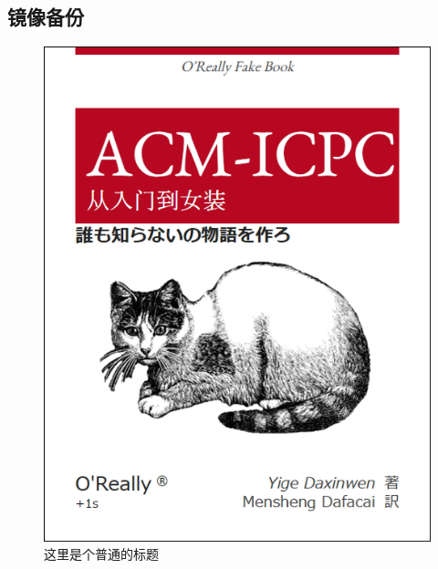 		\subsection{镜像备份}
			\begin{figure}[ht]
				\centering
				\includegraphics[scale=0.6]{figures/figure1.png}
				\caption{
					这里是个普通的标题
				}
				\label{fig:example}
			\end{figure}
